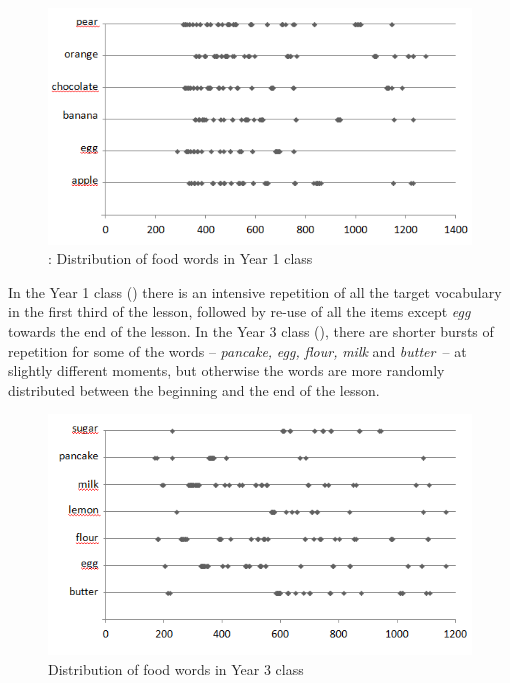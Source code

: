 \documentclass[output=paper,colorlinks,citecolor=brown,modfonts,nonflat]{../langscibook}
\begin{document}
\begin{figure}
\caption{\label{fig:hilton:6}: Distribution of food words in Year 1 class}
\includegraphics[width=\textwidth]{figures/hilton-img006.png}
\end{figure}
 

In the Year 1 class () there is an intensive repetition of all the target vocabulary in the first third of the lesson, followed by re-use of all the items except \textit{egg} towards the end of the lesson. In the Year 3 class (), there are shorter bursts of repetition for some of the words – \textit{pancake,} \textit{egg,} \textit{flour,} \textit{milk} and \textit{butter}~– at slightly different moments, but otherwise the words are more randomly distributed between the beginning and the end of the lesson.

\begin{figure}
\caption{\label{fig:hilton:7}Distribution of food words in Year 3 class}
\includegraphics[width=\textwidth]{figures/hilton-img007.png}
\end{figure}
 
\end{document}
